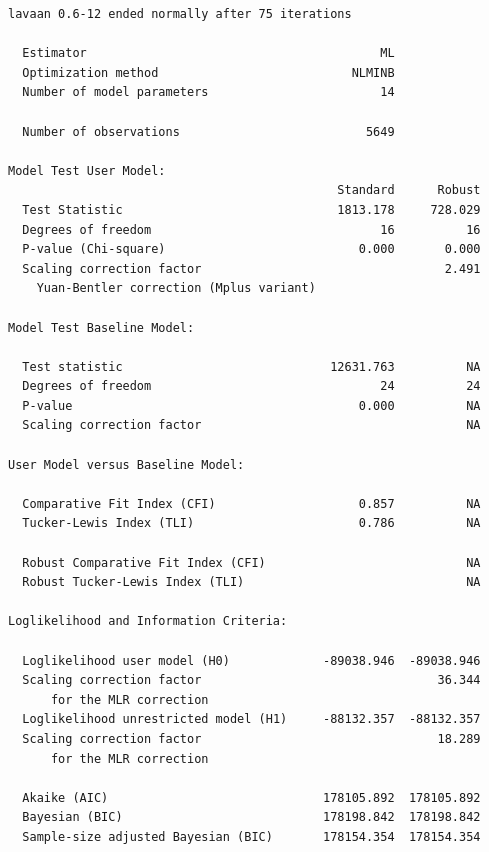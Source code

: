 \documentclass{article}
\begin{document}
\begin{verbatim}
lavaan 0.6-12 ended normally after 75 iterations

  Estimator                                         ML
  Optimization method                           NLMINB
  Number of model parameters                        14

  Number of observations                          5649

Model Test User Model:
                                              Standard      Robust
  Test Statistic                              1813.178     728.029
  Degrees of freedom                                16          16
  P-value (Chi-square)                           0.000       0.000
  Scaling correction factor                                  2.491
    Yuan-Bentler correction (Mplus variant)                       

Model Test Baseline Model:

  Test statistic                             12631.763          NA
  Degrees of freedom                                24          24
  P-value                                        0.000          NA
  Scaling correction factor                                     NA

User Model versus Baseline Model:

  Comparative Fit Index (CFI)                    0.857          NA
  Tucker-Lewis Index (TLI)                       0.786          NA
                                                                  
  Robust Comparative Fit Index (CFI)                            NA
  Robust Tucker-Lewis Index (TLI)                               NA

Loglikelihood and Information Criteria:

  Loglikelihood user model (H0)             -89038.946  -89038.946
  Scaling correction factor                                 36.344
      for the MLR correction                                      
  Loglikelihood unrestricted model (H1)     -88132.357  -88132.357
  Scaling correction factor                                 18.289
      for the MLR correction                                      
                                                                  
  Akaike (AIC)                              178105.892  178105.892
  Bayesian (BIC)                            178198.842  178198.842
  Sample-size adjusted Bayesian (BIC)       178154.354  178154.354


\end{verbatim}
\end{document}
